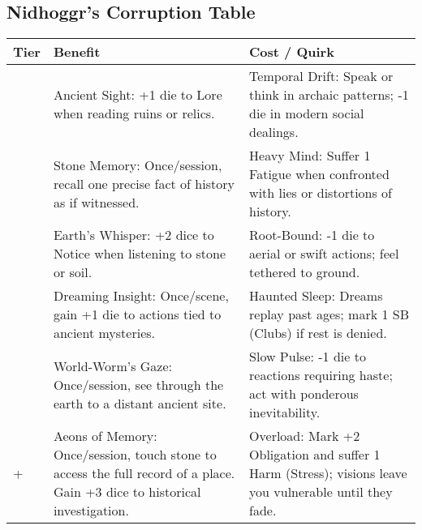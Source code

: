 \subsection*{Nidhoggr’s Corruption Table}
\label{sec:nidhoggr-corruption}

\begin{longtable}{>{\raggedright\arraybackslash}p{1cm} p{5cm} p{5cm}}
\toprule
\textbf{Tier} & \textbf{Benefit} & \textbf{Cost / Quirk} \\
\midrule
1 & Ancient Sight: +1 die to Lore when reading ruins or relics. & Temporal Drift: Speak or think in archaic patterns; -1 die in modern social dealings. \\
\midrule
2 & Stone Memory: Once/session, recall one precise fact of history as if witnessed. & Heavy Mind: Suffer 1 Fatigue when confronted with lies or distortions of history. \\
\midrule
3 & Earth’s Whisper: +2 dice to Notice when listening to stone or soil. & Root-Bound: -1 die to aerial or swift actions; feel tethered to ground. \\
\midrule
4 & Dreaming Insight: Once/scene, gain +1 die to actions tied to ancient mysteries. & Haunted Sleep: Dreams replay past ages; mark 1 SB (Clubs) if rest is denied. \\
\midrule
5 & World-Worm’s Gaze: Once/session, see through the earth to a distant ancient site. & Slow Pulse: -1 die to reactions requiring haste; act with ponderous inevitability. \\
\midrule
6+ & Aeons of Memory: Once/session, touch stone to access the full record of a place. Gain +3 dice to historical investigation. & Overload: Mark +2 Obligation and suffer 1 Harm (Stress); visions leave you vulnerable until they fade. \\
\bottomrule
\end{longtable}